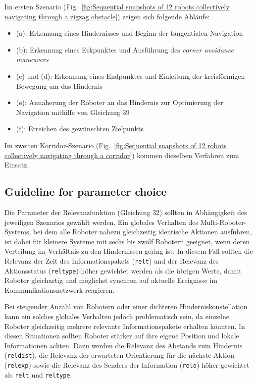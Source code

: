 \documentclass[conference]{IEEEtran}
\begin{document}
Im ersten Szenario (Fig.~\ref{fig:Sequential snapshots of 12 robots collectively navigating through a zigzag obstacle}) zeigen sich folgende Abläufe:
\begin{itemize}
\item (a): Erkennung eines Hindernisses und Beginn der tangentialen Navigation
\item (b): Erkennung eines Eckpunktes und Ausführung des \textit{corner avoidance maneuvers}
\item (c) und (d): Erkennung eines Endpunktes und Einleitung der kreisförmigen Bewegung um das Hindernis
\item (e): Annäherung der Roboter an das Hindernis zur Optimierung der Navigation mithilfe von Gleichung 39
\item (f): Erreichen des gewünschten Zielpunkts
\end{itemize}

Im zweiten Korridor-Szenario (Fig.~\ref{fig:Sequential snapshots of 12 robots collectively navigating through a corridor}) kommen dieselben Verfahren zum Einsatz.

\subsection*{Guideline for parameter choice}
Die Parameter der Relevanzfunktion (Gleichung 32) sollten in Abhängigkeit des 
jeweiligen Szenarios gewählt werden. Ein globales Verhalten des 
Multi-Roboter-Systems, bei dem alle Roboter nahezu gleichzeitig identische 
Aktionen ausführen, ist dabei für kleinere Systeme mit sechs bis zwölf 
Robotern geeignet, wenn deren Verteilung im Verhältnis zu den Hindernissen 
gering ist. In diesem Fall sollten die Relevanz der Zeit des Informationspakets 
(\texttt{relt}) und der Relevanz des Aktionsstatus (\texttt{reltype}) höher 
gewichtet werden als die übrigen Werte, damit Roboter gleichartig und möglichst
synchron auf aktuelle Ereignisse im Kommunikationsnetzwerk reagieren.

Bei steigender Anzahl von Robotern oder einer dichteren Hinderniskonstellation 
kann ein solches globales Verhalten jedoch problematisch sein, da einzelne 
Roboter gleichzeitig mehrere relevante Informationspakete erhalten könnten. 
In diesen Situationen sollten Roboter stärker auf ihre eigene Position und lokale 
Informationen achten. Dazu werden die Relevanz des Abstands zum Hindernis 
(\texttt{reldist}), die Relevanz der erwarteten Orientierung für die nächste Aktion 
(\texttt{relexp}) sowie die Relevanz des Senders der Information (\texttt{relo}) 
höher gewichtet als \texttt{relt} und \texttt{reltype}.
\end{document}
